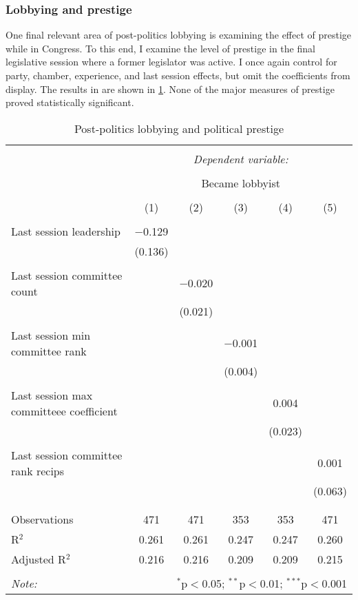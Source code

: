 \documentclass{article}
\begin{document}
\subsubsection{Lobbying and prestige}
One final relevant area of post-politics lobbying is examining the effect of prestige while in Congress. To this end, I examine the level of prestige in the final legislative session where a former legislator was active. I once again control for party, chamber, experience, and last session effects, but omit the coefficients from display. The results in are shown in \ref{tab:lobbying_prestige}. None of the major measures of prestige proved statistically significant. 
\begin{table}[!htbp] \centering 
    \caption{Post-politics lobbying and political prestige} 
    \label{tab:lobbying_prestige} 
  \begin{tabular}{@{\extracolsep{5pt}}lccccc} 
  \\[-1.8ex]\hline 
  \hline \\[-1.8ex] 
   & \multicolumn{5}{c}{\textit{Dependent variable:}} \\ 
  \cline{2-6} 
  \\[-1.8ex] & \multicolumn{5}{c}{Became lobbyist} \\ 
  \\[-1.8ex] & (1) & (2) & (3) & (4) & (5)\\ 
  \hline \\[-1.8ex] 
   Last session leadership & $-$0.129 &  &  &  &  \\ 
    & (0.136) &  &  &  &  \\ 
    & & & & & \\ 
   Last session committee count &  & $-$0.020 &  &  &  \\ 
    &  & (0.021) &  &  &  \\ 
    & & & & & \\ 
   Last session min committee rank &  &  & $-$0.001 &  &  \\ 
    &  &  & (0.004) &  &  \\ 
    & & & & & \\ 
   Last session max committeee coefficient &  &  &  & 0.004 &  \\ 
    &  &  &  & (0.023) &  \\ 
    & & & & & \\ 
    Last session committee rank recips &  &  &  &  & 0.001 \\ 
    &  &  &  &  & (0.063) \\ 
    & & & & & \\ 
  \hline \\[-1.8ex] 
  Observations & 471 & 471 & 353 & 353 & 471 \\ 
  R$^{2}$ & 0.261 & 0.261 & 0.247 & 0.247 & 0.260 \\ 
  Adjusted R$^{2}$ & 0.216 & 0.216 & 0.209 & 0.209 & 0.215 \\ 
  \hline 
  \hline \\[-1.8ex] 
  \textit{Note:}  & \multicolumn{5}{r}{$^{*}$p$<$0.05; $^{**}$p$<$0.01; $^{***}$p$<$0.001} \\ 
  \end{tabular} 
  \end{table}
\end{document}

